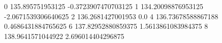 0 135.895751953125 -0.3723907470703125
1 134.20098876953125 -2.0671539306640625
2 136.2681427001953 0.0
4 136.73678588867188 0.4686431884765625
6 137.82952880859375 1.5613861083984375
8 138.9641571044922 2.696014404296875
